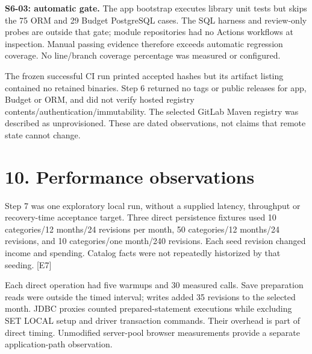 \documentclass[11pt,a4paper]{article}
\begin{document}
\textbf{S6-03: automatic gate.} The app bootstrap executes library unit tests but skips the 75 ORM and 29 Budget PostgreSQL cases. The SQL harness and review-only probes are outside that gate; module repositories had no Actions workflows at inspection. Manual passing evidence therefore exceeds automatic regression coverage. No line/\allowbreak{}branch coverage percentage was measured or configured.

The frozen successful CI run printed accepted hashes but its artifact listing contained no retained binaries. Step 6 returned no tags or public releases for app, Budget or ORM, and did not verify hosted registry contents/\allowbreak{}authentication/\allowbreak{}immutability. The selected GitLab Maven registry was described as unprovisioned. These are dated observations, not claims that remote state cannot change.

\section*{10. Performance observations}

Step 7 was one exploratory local run, without a supplied latency, throughput or recovery-time acceptance target. Three direct persistence fixtures used 10 categories/\allowbreak{}12 months/\allowbreak{}24 revisions per month, 50 categories/\allowbreak{}12 months/\allowbreak{}24 revisions, and 10 categories/\allowbreak{}one month/\allowbreak{}240 revisions. Each seed revision changed income and spending. Catalog facts were not repeatedly historized by that seeding. [E7]

Each direct operation had five warmups and 30 measured calls. Save preparation reads were outside the timed interval; writes added 35 revisions to the selected month. JDBC proxies counted prepared-statement executions while excluding SET LOCAL setup and driver transaction commands. Their overhead is part of direct timing. Unmodified server-pool browser measurements provide a separate application-path observation.
\end{document}

